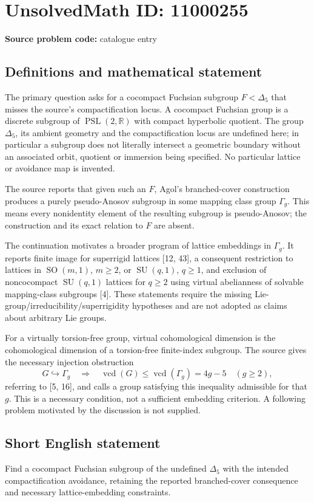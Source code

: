 \documentclass[11pt]{article}
\newcommand{\R}{\mathbb{R}}
\begin{document}
\section*{UnsolvedMath ID: 11000255}
\textbf{Source problem code:} catalogue entry
\subsection{Definitions and mathematical statement}
The primary question asks for a cocompact Fuchsian subgroup \(F<\Delta_5\) that misses the source's compactification locus. A cocompact Fuchsian group is a discrete subgroup of \(\operatorname{PSL}(2,\R)\) with compact hyperbolic quotient. The group \(\Delta_5\), its ambient geometry and the compactification locus are undefined here; in particular a subgroup does not literally intersect a geometric boundary without an associated orbit, quotient or immersion being specified. No particular lattice or avoidance map is invented.

The source reports that given such an \(F\), Agol's branched-cover construction produces a purely pseudo-Anosov subgroup in some mapping class group \(\Gamma_g\). This means every nonidentity element of the resulting subgroup is pseudo-Anosov; the construction and its exact relation to \(F\) are absent.

The continuation motivates a broader program of lattice embeddings in \(\Gamma_g\). It reports finite image for superrigid lattices [12, 43], a consequent restriction to lattices in \(\operatorname{SO}(m,1)\), \(m\geq2\), or \(\operatorname{SU}(q,1)\), \(q\geq1\), and exclusion of noncocompact \(\operatorname{SU}(q,1)\) lattices for \(q\geq2\) using virtual abelianness of solvable mapping-class subgroups [4]. These statements require the missing Lie-group/irreducibility/superrigidity hypotheses and are not adopted as claims about arbitrary Lie groups.

For a virtually torsion-free group, virtual cohomological dimension is the cohomological dimension of a torsion-free finite-index subgroup. The source gives the necessary injection obstruction
\[
 G\hookrightarrow\Gamma_g\quad\Longrightarrow\quad
 \operatorname{vcd}(G)\leq\operatorname{vcd}(\Gamma_g)=4g-5\quad(g\geq2),
\]
referring to [5, 16], and calls a group satisfying this inequality admissible for that \(g\). This is a necessary condition, not a sufficient embedding criterion. A following problem motivated by the discussion is not supplied.
\subsection{Short English statement}
Find a cocompact Fuchsian subgroup of the undefined \(\Delta_5\) with the intended compactification avoidance, retaining the reported branched-cover consequence and necessary lattice-embedding constraints.
\end{document}
